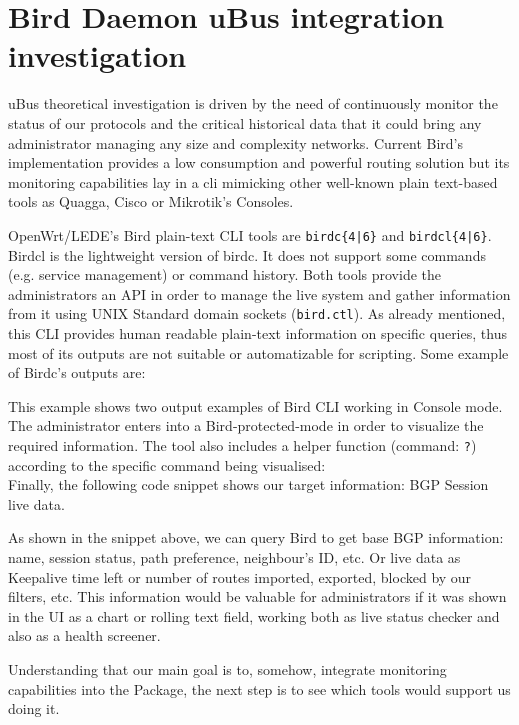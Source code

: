 \section{Bird Daemon uBus integration investigation}
uBus theoretical investigation is driven by the need of continuously monitor the status of our protocols and the critical historical data that it could bring any administrator managing any size and complexity networks. Current Bird's implementation provides a low consumption and powerful routing solution but its monitoring capabilities lay in a \acrshort{cli} mimicking other well-known plain text-based tools as Quagga, Cisco or Mikrotik's Consoles.

OpenWrt/LEDE's Bird plain-text CLI tools are \texttt{birdc\{4|6\}} and \texttt{birdcl\{4|6\}}. Birdcl is the lightweight version of birdc. It does not support some commands (e.g. service management) or command history. Both tools provide the administrators an API \cite{birdcapi} in order to manage the live system and gather information from it using UNIX Standard domain sockets (\texttt{bird.ctl}). As already mentioned, this CLI provides human readable plain-text information on specific queries, thus most of its outputs are not suitable or automatizable for scripting. Some example of Birdc's outputs are:



This example shows two output examples of Bird CLI working in Console mode. The administrator enters into a Bird-protected-mode in order to visualize the required information. The tool also includes a helper function (command: \texttt{?}) according to the specific command being visualised:\\



Finally, the following code snippet shows our target information: BGP Session live data.



As shown in the snippet above, we can query Bird to get base BGP information: name, session status, path preference, neighbour's ID, etc. Or live data as Keepalive time left or number of routes imported, exported, blocked by our filters, etc. This information would be valuable for administrators if it was shown in the UI as a chart or rolling text field, working both as live status checker and also as a health screener.

Understanding that our main goal is to, somehow, integrate monitoring capabilities into the Package, the next step is to see which tools would support us doing it.

